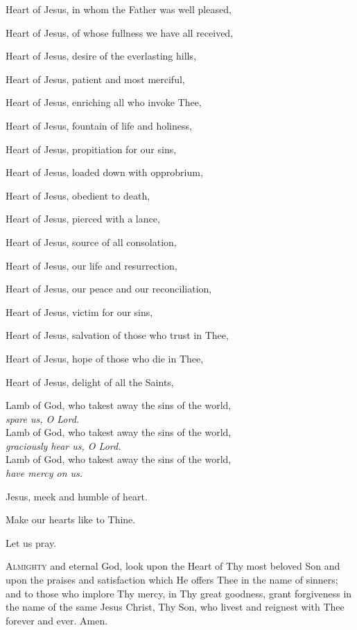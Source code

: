 \begin{hangparas}{1em}{1}
 Heart of Jesus, in whom the Father was     
 well pleased,
     
 Heart of Jesus, of whose fullness we have  
 all received,
     
 Heart of Jesus, desire of the everlasting  
 hills,
            
Heart of Jesus, patient and most merciful,    

Heart of Jesus, enriching all who invoke   
 Thee,             

 Heart of Jesus, fountain of life and       
 holiness,
         
 Heart of Jesus, propitiation for our       
 sins, 

 Heart of Jesus, loaded down with           
 opprobrium,



 Heart of Jesus, obedient to death, 

 Heart of Jesus, pierced with a lance,

 Heart of Jesus, source of all
 consolation, 

 Heart of Jesus, our life and              
 resurrection, 

 Heart of Jesus, our peace and our
 reconciliation,

 Heart of Jesus, victim for our sins,

 Heart of Jesus, salvation of those who
 trust in Thee, 

 Heart of Jesus, hope of those who die in
 Thee,

 Heart of Jesus, delight of all the
 Saints,
 
 \end{hangparas}
\filbreak
 
Lamb of God, who takest away the sins of the world,\\
\textit{spare us, O Lord.}\\
Lamb of God, who takest away the sins of the world,\\
\textit{graciously hear us, O Lord.}\\
Lamb of God, who takest away the sins of the world,\\
\textit{have mercy on us.}

\begin{hangparas}{1em}{-1} 
\parskip0mm
\Vbar Jesus, meek and humble of heart.

\Rbar Make our hearts like to Thine.
 \end{hangparas}

{\centering Let us pray.\par}

\lettrine{A}{lmighty} and eternal God, look upon the Heart of Thy most beloved Son and upon the
 praises and satisfaction which He offers Thee in the name of sinners; and to those
 who implore Thy mercy, in Thy great goodness, grant forgiveness in the name of the
 same Jesus Christ, Thy Son, who livest and reignest with Thee forever
 and ever. \Rbar Amen.


